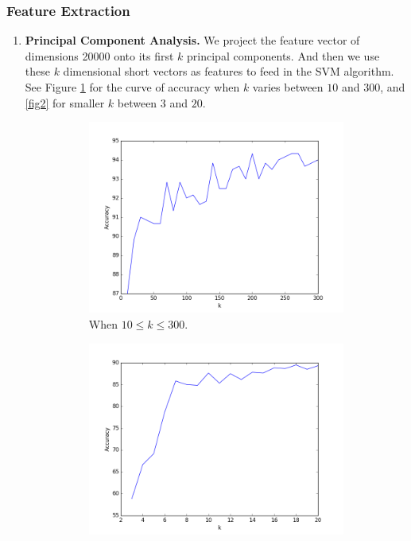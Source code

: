 \documentclass{article} %
\begin{document}
    \subsubsection{Feature Extraction}
    \begin{enumerate}
      \item \textbf{Principal Component Analysis.} We project the feature vector of dimensions 20000 onto its first $k$ principal components. And then we use these $k$ dimensional short vectors as features to feed in the SVM algorithm. See Figure \ref{fig1} for the curve of accuracy when $k$ varies between $10$ and $300$, and \ref{fig2} for smaller $k$ between $3$ and $20$.
      \begin{figure}[H]
      \centering
      \begin{subfigure}{.5\textwidth}
      \centering
      \includegraphics[width=\linewidth]{figure_1.png}
      \caption{When $10\leq k\leq 300$.}
      \label{fig1}
      \end{subfigure}%
      \begin{subfigure}{.5\textwidth}
      \centering
      \includegraphics[width=\linewidth]{figure_2.png}

\end{subfigure}
\end{figure}
\end{enumerate}
\end{document}
